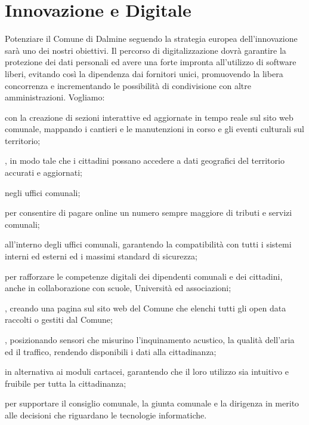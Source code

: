 \section{Innovazione e Digitale}
Potenziare il Comune di Dalmine seguendo la strategia europea dell'innovazione sarà uno dei nostri obiettivi. Il percorso di digitalizzazione dovrà garantire la protezione dei dati personali ed avere una forte impronta all'utilizzo di software liberi, evitando così la dipendenza dai fornitori unici, promuovendo la libera concorrenza e incrementando le possibilità di condivisione con altre amministrazioni. Vogliamo:

 con la creazione di sezioni interattive ed aggiornate in tempo reale sul sito web comunale, mappando i cantieri e le manutenzioni in corso e gli eventi culturali sul territorio;

, in modo tale che i cittadini possano accedere a dati geografici del territorio accurati e aggiornati;

 negli uffici comunali;

 per consentire di pagare online un numero sempre maggiore di tributi e servizi comunali;

 all'interno degli uffici comunali, garantendo la compatibilità con tutti i sistemi interni ed esterni ed i massimi standard di sicurezza;

 per rafforzare le competenze digitali dei dipendenti comunali e dei cittadini, anche in collaborazione con scuole, Università ed associazioni;

, creando una pagina sul sito web del Comune che elenchi tutti gli open data raccolti o gestiti dal Comune;

, posizionando sensori che misurino l'inquinamento acustico, la qualità dell'aria ed il traffico, rendendo disponibili i dati alla cittadinanza;

 in alternativa ai moduli cartacei, garantendo che il loro utilizzo sia intuitivo e fruibile per tutta la cittadinanza;

 per supportare il consiglio comunale, la giunta comunale e la dirigenza in merito alle decisioni che riguardano le tecnologie informatiche.
